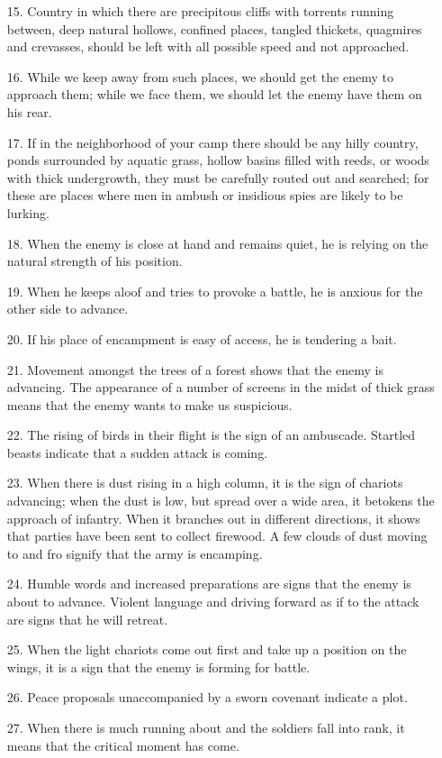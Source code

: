 \documentclass[11pt,openany]{memoir}
\newcommand{\enumeratemargin}{1.30em}
\begin{document}
\begin{enumerate}[leftmargin=\enumeratemargin]
\item[15.] Country in which there are precipitous cliffs with torrents running between, deep natural hollows, confined places, tangled thickets, quagmires and crevasses, should be left with all possible speed and not approached.
\item[16.] While we keep away from such places, we should get the enemy to approach them; while we face them, we should let the enemy have them on his rear.
\item[17.] If in the neighborhood of your camp there should be any hilly country, ponds surrounded by aquatic grass, hollow basins filled with reeds, or woods with thick undergrowth, they must be carefully routed out and searched; for these are places where men in ambush or insidious spies are likely to be lurking.
\item[18.] When the enemy is close at hand and remains quiet, he is relying on the natural strength of his position.
\item[19.] When he keeps aloof and tries to provoke a battle, he is anxious for the other side to advance.
\item[20.] If his place of encampment is easy of access, he is tendering a bait.
\item[21.] Movement amongst the trees of a forest shows that the enemy is advancing. The appearance of a number of screens in the midst of thick grass means that the enemy wants to make us suspicious.
\item[22.] The rising of birds in their flight is the sign of an ambuscade. Startled beasts indicate that a sudden attack is coming.
\item[23.] When there is dust rising in a high column, it is the sign of chariots advancing; when the dust is low, but spread over a wide area, it betokens the approach of infantry. When it branches out in different directions, it shows that parties have been sent to collect firewood. A few clouds of dust moving to and fro signify that the army is encamping.
\item[24.] Humble words and increased preparations are signs that the enemy is about to advance. Violent language and driving forward as if to the attack are signs that he will retreat.
\item[25.] When the light chariots come out first and take up a position on the wings, it is a sign that the enemy is forming for battle.
\item[26.] Peace proposals unaccompanied by a sworn covenant indicate a plot.
\item[27.] When there is much running about and the soldiers fall into rank, it means that the critical moment has come.

\end{enumerate}
\end{document}
